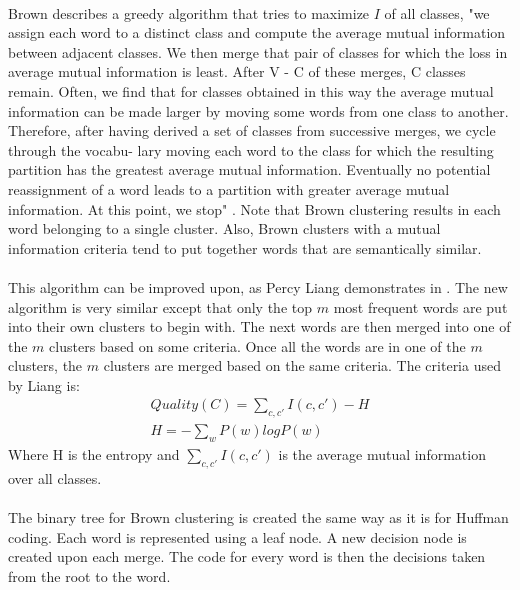 \paragraph{}
Brown describes a greedy algorithm that tries to maximize $I$ of all classes, "we assign each word to a distinct class and compute the average mutual information 
between adjacent classes. We then merge that pair of classes for which the loss in 
average mutual information is least. After V - C of these merges, C classes remain. 
Often, we find that for classes obtained in this way the average mutual information 
can be made larger by moving some words from one class to another. Therefore, after 
having derived a set of classes from successive merges, we cycle through the vocabu- 
lary moving each word to the class for which the resulting partition has the greatest 
average mutual information. Eventually no potential reassignment of a word leads to 
a partition with greater average mutual information. At this point, we stop" \cite[pg. 472]{Brown1992}.  
Note that Brown clustering results in each word belonging to a single cluster. Also, Brown clusters with a mutual information criteria tend to put together words that are semantically similar.
\paragraph{}
This algorithm can be improved upon, as Percy Liang demonstrates in \cite{Liang2005}. The new algorithm is very similar except that only the top $m$ most frequent words are put into their own clusters to begin with. The next words are then merged into one of the $m$ clusters based on some criteria. Once all the words are in one of the $m$ clusters, the $m$ clusters are merged based on the same criteria.
The criteria used by Liang is:
\begin{align}
Quality(C) = \sum_{c,c'} I(c,c') - H
\\
H= -\sum_w P(w)logP(w) \nonumber
\end{align}
Where H is the entropy and $\sum_{c,c'} I(c,c')$ is the average mutual information over all classes.
\paragraph{}
The binary tree for Brown clustering is created the same way as it is for Huffman coding. Each word is represented using a leaf node. A new decision node is created upon each merge. The code for every word is then the decisions taken from the root to the word.

